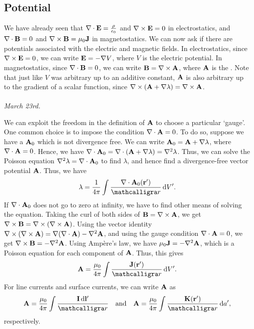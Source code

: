 \subsection{Potential}

We have already seen that $\nabla \cdot \mathbf{E} = \frac{\rho}{\epsilon_{0}}$ and $\nabla \times \mathbf{E} = 0$ in electrostatics, and $\nabla \cdot \mathbf{B} = 0$ and $\nabla \times \mathbf{B} = \mu_{0} \mathbf{J}$ in magnetostatics. We can now ask if there are potentials associated with the electric and magnetic fields. In electrostatics, since $\nabla \times \mathbf{E} = 0$, we can write $\mathbf{E} = -\nabla V$, where $V$ is the electric potential. In magnetostatics, since $\nabla \cdot \mathbf{B} = 0$, we can write $\mathbf{B} = \nabla \times \mathbf{A}$, where $\mathbf{A}$ is the . Note that just like $V$ was arbitrary up to an additive constant, $\mathbf{A}$ is also arbitrary up to the gradient of a scalar function, since $\nabla \times (\mathbf{A} + \nabla \lambda) = \nabla \times \mathbf{A}$.
\\ \\
\textit{March 23rd.}

We can exploit the freedom in the definition of $\mathbf{A}$ to choose a particular `gauge'. One common choice is to impose the condition $\nabla \cdot \mathbf{A} = 0$. To do so, suppose we have a $\mathbf{A}_{0}$ which is not divergence free. We can write $\mathbf{A}_{0} = \mathbf{A} + \nabla \lambda$, where $\nabla \cdot \mathbf{A} = 0$. Hence, we have $\nabla \cdot \mathbf{A}_{0} = \nabla \cdot (\mathbf{A} + \nabla \lambda) = \nabla^{2} \lambda$. Thus, we can solve the Poisson equation $\nabla^{2} \lambda = \nabla \cdot \mathbf{A}_{0}$ to find $\lambda$, and hence find a divergence-free vector potential $\mathbf{A}$. Thus, we have
\begin{align}
    \lambda = \frac{1}{4 \pi} \int \frac{\nabla \cdot \bv{A}_{0}(\bv{r}')}{\curs{r}} \, \di{V}'.
\end{align}
If $\nabla \cdot \mathbf{A}_{0}$ does not go to zero at infinity, we have to find other means of solving the equation. Taking the curl of both sides of $\mathbf{B} = \nabla \times \mathbf{A}$, we get $\nabla \times \mathbf{B} = \nabla \times (\nabla \times \mathbf{A})$. Using the vector identity $\nabla \times (\nabla \times \mathbf{A}) = \nabla (\nabla \cdot \mathbf{A}) - \nabla^{2} \mathbf{A}$, and using the gauge condition $\nabla \cdot \mathbf{A} = 0$, we get $\nabla \times \mathbf{B} = -\nabla^{2} \mathbf{A}$. Using Ampère's law, we have $\mu_{0} \mathbf{J} = -\nabla^{2} \mathbf{A}$, which is a Poisson equation for each component of $\mathbf{A}$. Thus, this gives
\begin{align}
    \bv{A} = \frac{\mu_{0}}{4 \pi} \int \frac{\bv{J}(\bv{r}')}{\curs{r}} \, \di{V}'.
\end{align}
For line currents and surface currents, we can write $\mathbf{A}$ as
\begin{align}
    \bv{A} = \frac{\mu_{0}}{4 \pi} \int \frac{\bv{I} \, \di{\bv{l}'}}{\curs{r}} \quad \text{and} \quad \bv{A} = \frac{\mu_{0}}{4 \pi} \int \frac{\bv{K}(\bv{r}')}{\curs{r}} \, \di{a}',
\end{align}
respectively. 

